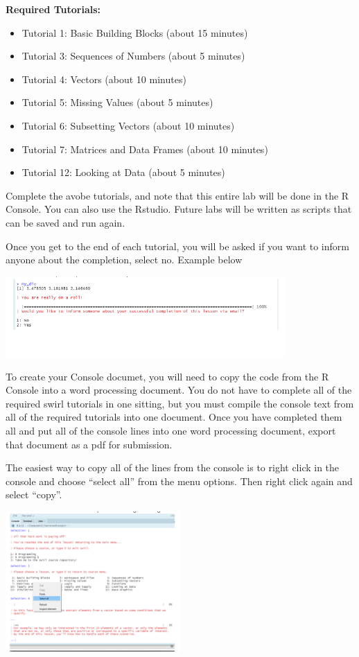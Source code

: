 \documentclass{article}
\begin{document}
\textbf{Required Tutorials:}
\begin{itemize}
    \item Tutorial 1: Basic Building Blocks (about 15 minutes)
    \item Tutorial 3: Sequences of Numbers (about 5 minutes)
    \item Tutorial 4: Vectors (about 10 minutes)
    \item Tutorial 5: Missing Values (about 5 minutes)
    \item Tutorial 6: Subsetting Vectors (about 10 minutes)
    \item Tutorial 7: Matrices and Data Frames (about 10 minutes)
    \item Tutorial 12: Looking at Data (about 5 minutes)
\end{itemize}
Complete the avobe tutorials, and note that this entire lab will be done in the R Console. You can also use the Rstudio.  Future labs will be written as scripts that can be saved and run again.

Once you get to the end of each tutorial, you will be asked if you want to inform anyone about the completion, select no.  Example below
\begin{center}
    \includegraphics[width=0.8\textwidth]{3611_p4.png}
\end{center}


To create your Console documet, you will need to copy the code from the R Console into a word processing document.  You do not have to complete all of the required swirl tutorials in one sitting, but you must compile the console text from all of the required tutorials into one document.  Once you have completed them all and put all of the console lines into one word processing document, export that document as a pdf for submission. 

The easiest way to copy all of the lines from the console is to right click in the console and choose “select all” from the menu options.  Then right click again and select “copy”.
\begin{center}
    \includegraphics[width=0.5\textwidth]{3611_p5.png}
\end{center}
\end{document}
